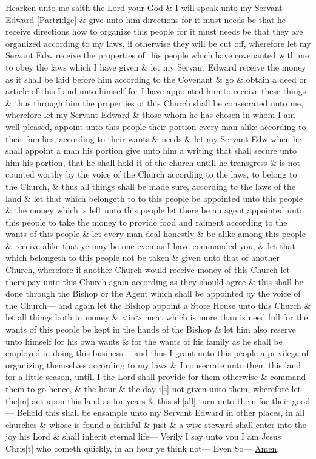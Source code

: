 				Hearken unto me saith the Lord your God \& I will speak unto my Servant Edward [Partridge] \& give unto him directions for it must needs be that he receive directions how to organize this people for it must needs be that they are organized according to my laws, if otherwise they will be cut off, wherefore let my Servant Edw receive the properties of this people which have covenanted with me to obey the laws which I have given \& let my Servant Edward receive the money as it shall be laid before him according to the Covenant \& go \& obtain a deed or article of this Land unto himself for I have appointed him to receive these things \& thus through him the properties of this Church shall be consecrated unto me, wherefore let my Servant Edward \& those whom he has chosen in whom I am well pleased, appoint unto this people their portion every man alike according to their families, according to their wants \& needs \& let my Servant Edw when he shall appoint a man his portion give unto him a writing that shall secure unto him his portion, that he shall hold it of the church untill he transgress \& is not counted worthy by the voice of the Church according to the laws, to belong to the Church, \& thus all things shall be made sure, according to the laws of the land \& let that which belongeth to to this people be appointed unto this people \& the money which is left unto this people let there be an agent appointed unto this people to take the money to provide food and raiment according to the wants of this people \& let every man deal honestly \& be alike among this people \& receive alike that ye may be one even as I have commanded you, \& let that which belongeth to this people not be taken \& given unto that of another Church, wherefore if another Church would receive money of this Church let them pay unto this Church again according as they should agree \& this shall be done through the Bishop or the Agent which shall be appointed by the voice of the Church--- and again let the Bishop appoint a Store House unto this Church \& let all things both in money \& <in> meat which is more than is need full for the wants of this people be kept in the hands of the Bishop \& let him also reserve unto himself for his own wants \& for the wants of his family as he shall be employed in doing this business--- and thus I grant unto this people a privilege of organizing themselves according to my laws \& I consecrate unto them this land for a little season, untill I the Lord shall provide for them otherwise \& command them to go hence, \& the hour \& the day i[s] not given unto them, wherefore let the[m] act upon this land as for years \& this sh[all] turn unto them for their good--- Behold this shall be ensample unto my Servant Edward in other places, in all churches \& whose is found a faithful \& just \& a wise steward shall enter into the joy his Lord \& shall inherit eternal life--- Verily I say unto you I am Jesus Chris[t] who cometh quickly, in an hour ye think not--- Even So--- \uline{Amen}.
		
